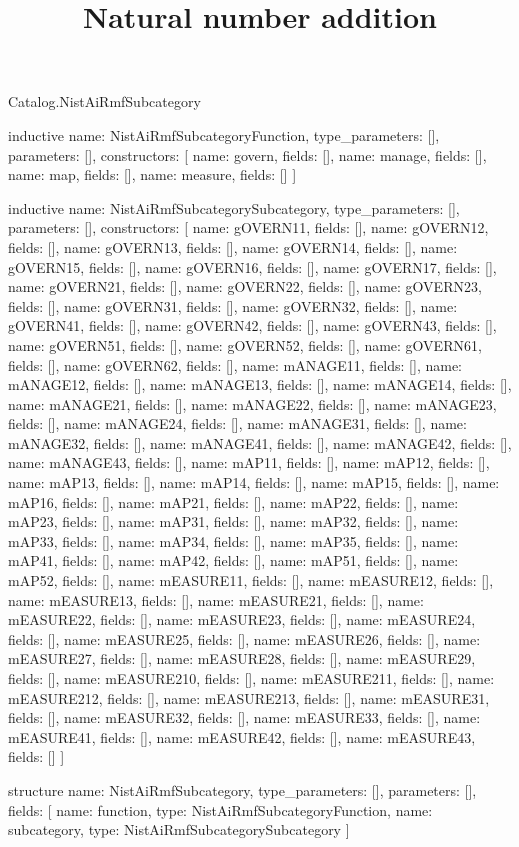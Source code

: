 \begin{lexlean}{Catalog.NistAiRmfSubcategory}
\title{Natural number addition}
\begin{semanticmodule}
inductive{
  name: NistAiRmfSubcategoryFunction,
  type_parameters: [],
  parameters: [],
  constructors: [
    {name: govern, fields: []},
    {name: manage, fields: []},
    {name: map, fields: []},
    {name: measure, fields: []}
  ]
}

inductive{
  name: NistAiRmfSubcategorySubcategory,
  type_parameters: [],
  parameters: [],
  constructors: [
    {name: gOVERN11, fields: []},
    {name: gOVERN12, fields: []},
    {name: gOVERN13, fields: []},
    {name: gOVERN14, fields: []},
    {name: gOVERN15, fields: []},
    {name: gOVERN16, fields: []},
    {name: gOVERN17, fields: []},
    {name: gOVERN21, fields: []},
    {name: gOVERN22, fields: []},
    {name: gOVERN23, fields: []},
    {name: gOVERN31, fields: []},
    {name: gOVERN32, fields: []},
    {name: gOVERN41, fields: []},
    {name: gOVERN42, fields: []},
    {name: gOVERN43, fields: []},
    {name: gOVERN51, fields: []},
    {name: gOVERN52, fields: []},
    {name: gOVERN61, fields: []},
    {name: gOVERN62, fields: []},
    {name: mANAGE11, fields: []},
    {name: mANAGE12, fields: []},
    {name: mANAGE13, fields: []},
    {name: mANAGE14, fields: []},
    {name: mANAGE21, fields: []},
    {name: mANAGE22, fields: []},
    {name: mANAGE23, fields: []},
    {name: mANAGE24, fields: []},
    {name: mANAGE31, fields: []},
    {name: mANAGE32, fields: []},
    {name: mANAGE41, fields: []},
    {name: mANAGE42, fields: []},
    {name: mANAGE43, fields: []},
    {name: mAP11, fields: []},
    {name: mAP12, fields: []},
    {name: mAP13, fields: []},
    {name: mAP14, fields: []},
    {name: mAP15, fields: []},
    {name: mAP16, fields: []},
    {name: mAP21, fields: []},
    {name: mAP22, fields: []},
    {name: mAP23, fields: []},
    {name: mAP31, fields: []},
    {name: mAP32, fields: []},
    {name: mAP33, fields: []},
    {name: mAP34, fields: []},
    {name: mAP35, fields: []},
    {name: mAP41, fields: []},
    {name: mAP42, fields: []},
    {name: mAP51, fields: []},
    {name: mAP52, fields: []},
    {name: mEASURE11, fields: []},
    {name: mEASURE12, fields: []},
    {name: mEASURE13, fields: []},
    {name: mEASURE21, fields: []},
    {name: mEASURE22, fields: []},
    {name: mEASURE23, fields: []},
    {name: mEASURE24, fields: []},
    {name: mEASURE25, fields: []},
    {name: mEASURE26, fields: []},
    {name: mEASURE27, fields: []},
    {name: mEASURE28, fields: []},
    {name: mEASURE29, fields: []},
    {name: mEASURE210, fields: []},
    {name: mEASURE211, fields: []},
    {name: mEASURE212, fields: []},
    {name: mEASURE213, fields: []},
    {name: mEASURE31, fields: []},
    {name: mEASURE32, fields: []},
    {name: mEASURE33, fields: []},
    {name: mEASURE41, fields: []},
    {name: mEASURE42, fields: []},
    {name: mEASURE43, fields: []}
  ]
}

structure{
  name: NistAiRmfSubcategory,
  type_parameters: [],
  parameters: [],
  fields: [
    {name: function, type: NistAiRmfSubcategoryFunction},
    {name: subcategory, type: NistAiRmfSubcategorySubcategory}
  ]
}
\end{semanticmodule}
\end{lexlean}
